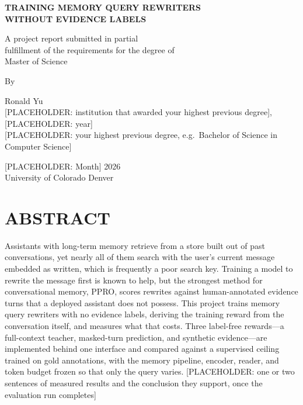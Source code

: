 \documentclass[12pt,letterpaper,oneside]{report}
\newcommand{\ph}[1]{\textcolor{phtext}{[\textsf{\footnotesize PLACEHOLDER: #1}]}}
\begin{document}

\begin{titlepage}
\centering
\singlespacing
\vspace*{0.75in}

{\bfseries\large TRAINING MEMORY QUERY REWRITERS\\[2pt]
WITHOUT EVIDENCE LABELS\par}

\vfill

A project report submitted in partial\\
fulfillment of the requirements for the degree of\\
Master of Science

\vfill

By

\vspace{0.4in}

Ronald Yu\\
\ph{institution that awarded your highest previous degree}, \ph{year}\\
\ph{your highest previous degree, e.g.\ Bachelor of Science in Computer Science}

\vfill

\ph{Month} 2026\\
University of Colorado Denver

\vspace{0.5in}
\end{titlepage}

\setcounter{page}{2}

\chapter*{ABSTRACT}

Assistants with long-term memory retrieve from a store built out of past
conversations, yet nearly all of them search with the user's current message
embedded as written, which is frequently a poor search key. Training a model to
rewrite the message first is known to help, but the strongest method for
conversational memory, PPRO, scores rewrites against human-annotated evidence
turns that a deployed assistant does not possess. This project trains memory
query rewriters with no evidence labels, deriving the training reward from the
conversation itself, and measures what that costs. Three label-free rewards---a
full-context teacher, masked-turn prediction, and synthetic evidence---are
implemented behind one interface and compared against a supervised ceiling
trained on gold annotations, with the memory pipeline, encoder, reader, and
token budget frozen so that only the query varies.
\ph{one or two sentences of measured results and the conclusion they support,
once the evaluation run completes}
\end{document}
